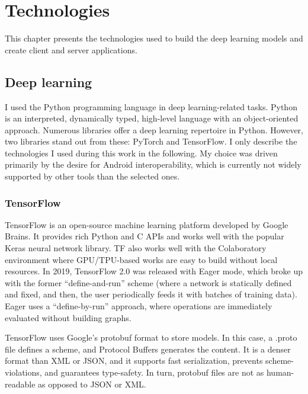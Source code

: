 \chapter{Technologies}

This chapter presents the technologies used to build the deep learning models and create client and server applications.

\section{Deep learning}

I used the Python\cite{Python} programming language in deep learning-related tasks. Python is an interpreted, dynamically typed, high-level language with an object-oriented approach. Numerous libraries offer a deep learning repertoire in Python. However, two libraries stand out from these: PyTorch and TensorFlow. I only describe the technologies I used during this work in the following. My choice was driven primarily by the desire for Android interoperability, which is currently not widely supported by other tools than the selected ones.

\subsection{TensorFlow}

TensorFlow\cite{TensorFlow} is an open-source machine learning platform developed by Google Brains. It provides rich Python and C APIs and works well with the popular Keras neural network library. TF also works well with the Colaboratory environment where GPU/TPU-based works are easy to build without local resources. In 2019, TensorFlow 2.0 was released with Eager mode, which broke up with the former ``define-and-run'' scheme (where a network is statically defined and fixed, and then, the user periodically feeds it with batches of training data). Eager uses a ``define-by-run'' approach\cite{TensorFlowEager}, where operations are immediately evaluated without building graphs.

TensorFlow uses Google's protobuf\cite{Protobuf} format to store models. In this case, a .proto file defines a scheme, and Protocol Buffers generates the content. It is a denser format than XML or JSON, and it supports fast serialization, prevents scheme-violations, and guarantees type-safety\cite{ProtobufVsFlatbuf}. In turn, protobuf files are not as human-readable as opposed to JSON or XML.

